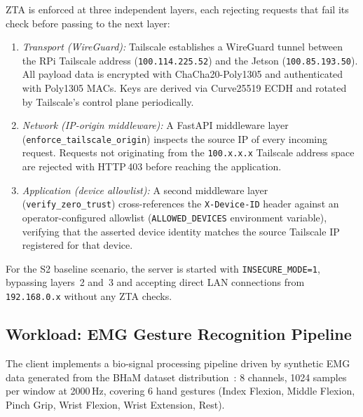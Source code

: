 \documentclass[10pt,twocolumn]{article}
\begin{document}
ZTA is enforced at three independent layers, each rejecting requests that
fail its check before passing to the next layer:

\begin{enumerate}[leftmargin=1.5em]
    \item \emph{Transport (WireGuard):} Tailscale establishes a WireGuard
          tunnel between the RPi Tailscale address (\texttt{100.114.225.52})
          and the Jetson (\texttt{100.85.193.50}).  All payload data is
          encrypted with ChaCha20-Poly1305 and authenticated with
          Poly1305 MACs.  Keys are derived via Curve25519 ECDH and rotated
          by Tailscale's control plane periodically.

    \item \emph{Network (IP-origin middleware):} A FastAPI middleware layer
          (\texttt{enforce\_tailscale\_origin}) inspects the source IP of
          every incoming request.  Requests not originating from the
          \texttt{100.x.x.x} Tailscale address space are rejected with
          HTTP\,403 before reaching the application.

    \item \emph{Application (device allowlist):} A second middleware layer
          (\texttt{verify\_zero\_trust}) cross-references the
          \texttt{X-Device-ID} header against an operator-configured
          allowlist (\texttt{ALLOWED\_DEVICES} environment variable),
          verifying that the asserted device identity matches the
          source Tailscale IP registered for that device.
\end{enumerate}

For the S2 baseline scenario, the server is started with
\texttt{INSECURE\_MODE=1}, bypassing layers~2 and~3 and accepting direct
LAN connections from \texttt{192.168.0.x} without any ZTA checks.

\subsection{Workload: EMG Gesture Recognition Pipeline}

The client implements a bio-signal processing pipeline driven by synthetic
EMG data generated from the BHaM dataset distribution~\cite{bham_dataset}:
8 channels, 1024 samples per window at 2000\,Hz, covering 6 hand gestures
(Index Flexion, Middle Flexion, Pinch Grip, Wrist Flexion, Wrist Extension,
Rest).
\end{document}
